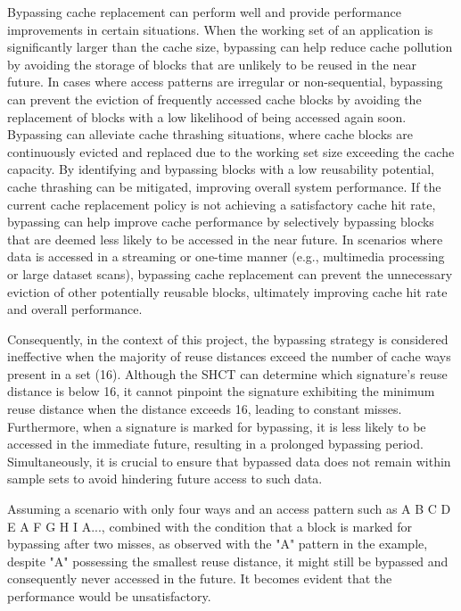 Bypassing cache replacement can perform well and provide performance improvements in certain situations. When the working set of an application is significantly larger than the cache size, bypassing can help reduce cache pollution by avoiding the storage of blocks that are unlikely to be reused in the near future.  In cases where access patterns are irregular or non-sequential, bypassing can prevent the eviction of frequently accessed cache blocks by avoiding the replacement of blocks with a low likelihood of being accessed again soon. Bypassing can alleviate cache thrashing situations, where cache blocks are continuously evicted and replaced due to the working set size exceeding the cache capacity. By identifying and bypassing blocks with a low reusability potential, cache thrashing can be mitigated, improving overall system performance. If the current cache replacement policy is not achieving a satisfactory cache hit rate, bypassing can help improve cache performance by selectively bypassing blocks that are deemed less likely to be accessed in the near future. In scenarios where data is accessed in a streaming or one-time manner (e.g., multimedia processing or large dataset scans), bypassing cache replacement can prevent the unnecessary eviction of other potentially reusable blocks, ultimately improving cache hit rate and overall performance\cite{Gao2010}. \par
Consequently, in the context of this project, the bypassing strategy is considered ineffective when the majority of reuse distances exceed the number of cache ways present in a set (16). Although the SHCT can determine which signature's reuse distance is below 16, it cannot pinpoint the signature exhibiting the minimum reuse distance when the distance exceeds 16, leading to constant misses. Furthermore, when a signature is marked for bypassing, it is less likely to be accessed in the immediate future, resulting in a prolonged bypassing period. Simultaneously, it is crucial to ensure that bypassed data does not remain within sample sets to avoid hindering future access to such data.\par
Assuming a scenario with only four ways and an access pattern such as A B C D E A F G H I A..., combined with the condition that a block is marked for bypassing after two misses, as observed with the "A" pattern in the example, despite "A" possessing the smallest reuse distance, it might still be bypassed and consequently never accessed in the future. It becomes evident that the performance would be unsatisfactory.\par
